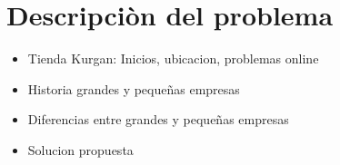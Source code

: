 \section{Descripciòn del problema}

\begin{itemize}

\item Tienda Kurgan: Inicios, ubicacion, problemas online
\item Historia grandes y pequeñas empresas
\item Diferencias entre grandes y pequeñas empresas
\item Solucion propuesta


\end{itemize}




